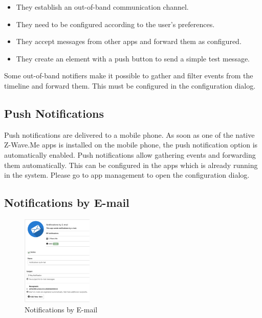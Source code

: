 \begin{itemize}
\item They establish an out-of-band communication channel.
\item They need to be configured according to the user’s preferences.
\item They accept messages from other apps and forward them as configured.
\item They create an element with a push button to send a simple test message.
\end{itemize}

Some out-of-band notifiers make it possible to gather and filter events from the timeline 
and forward them. This must be configured in the configuration dialog.

\subsection{Push Notifications}

Push notifications are delivered to a mobile phone. As soon as one of the native Z-Wave.Me 
apps is installed on the mobile phone, the push notification option is automatically 
enabled. Push notifications allow gathering events and forwarding them automatically. This 
can be configured in the apps  which is already running in the 
system. Please go to  app management to open the configuration dialog.

\subsection{Notifications by E-mail}

\begin{figure}
\begin{center}
\includegraphics[width=0.3\textwidth]{pngs/cap6/app31.png}
\caption{Notifications by E-mail}
\label{app31}
\end{center}
\end{figure}


